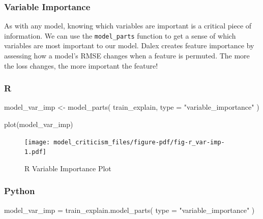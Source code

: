 \documentclass[
  letterpaper,
]{krantz}
\newenvironment{Shaded}{}{}
\newcommand{\AttributeTok}[1]{\textcolor[rgb]{0.49,0.56,0.16}{#1}}
\newcommand{\BuiltInTok}[1]{\textcolor[rgb]{0.00,0.50,0.00}{#1}}
\newcommand{\FunctionTok}[1]{\textcolor[rgb]{0.02,0.16,0.49}{#1}}
\newcommand{\NormalTok}[1]{#1}
\newcommand{\OperatorTok}[1]{\textcolor[rgb]{0.40,0.40,0.40}{#1}}
\newcommand{\OtherTok}[1]{\textcolor[rgb]{0.00,0.44,0.13}{#1}}
\newcommand{\StringTok}[1]{\textcolor[rgb]{0.25,0.44,0.63}{#1}}
\begin{document}
\subsubsection{Variable Importance}\label{variable-importance}

As with any model, knowing which variables are important is a critical
piece of information. We can use the \texttt{model\_parts} function to
get a sense of which variables are most important to our model. Dalex
creates feature importance by assessing how a model's RMSE changes when
a feature is permuted. The more the loss changes, the more important the
feature!

\subsubsection{R}

\begin{Shaded}
\begin{Highlighting}[]
\NormalTok{model\_var\_imp }\OtherTok{\textless{}{-}} \FunctionTok{model\_parts}\NormalTok{(}
\NormalTok{  train\_explain, }\AttributeTok{type =} \StringTok{"variable\_importance"}
\NormalTok{)}
\end{Highlighting}
\end{Shaded}

\begin{Shaded}
\begin{Highlighting}[]
\FunctionTok{plot}\NormalTok{(model\_var\_imp)}
\end{Highlighting}
\end{Shaded}

\begin{figure}[H]

{\centering \texttt{[image: model\_criticism\_files/figure-pdf/fig-r\_var-imp-1.pdf]}

}

\caption{\label{fig-r_var-imp}R Variable Importance Plot}

\end{figure}

\subsubsection{Python}

\begin{Shaded}
\begin{Highlighting}[]
\NormalTok{model\_var\_imp }\OperatorTok{=}\NormalTok{ train\_explain.model\_parts(}
  \BuiltInTok{type} \OperatorTok{=} \StringTok{"variable\_importance"}
\NormalTok{)}
\end{Highlighting}
\end{Shaded}
\end{document}
